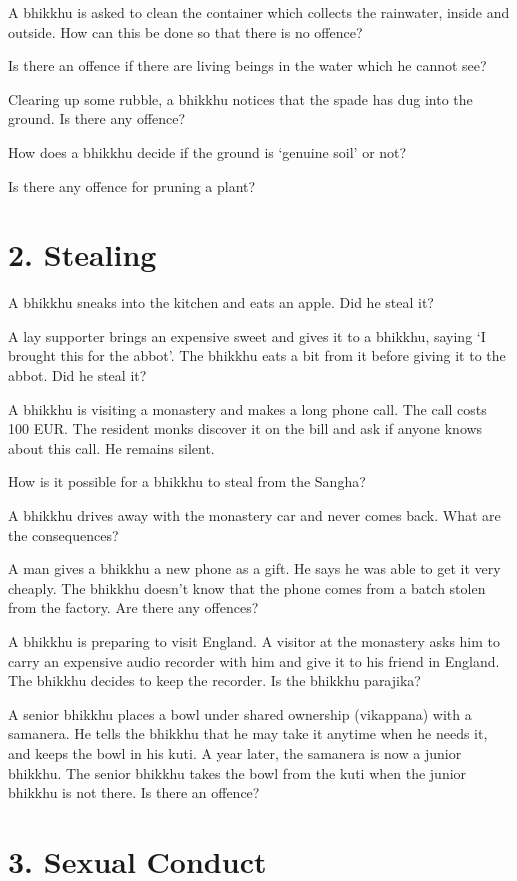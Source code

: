 A bhikkhu is asked to clean the container which collects the rainwater,
inside and outside. How can this be done so that there is no offence?

Is there an offence if there are living beings in the water which he
cannot see?

Clearing up some rubble, a bhikkhu notices that the spade has dug into
the ground. Is there any offence?

How does a bhikkhu decide if the ground is `genuine soil' or not?

Is there any offence for pruning a plant?

\section{2. Stealing}

A bhikkhu sneaks into the kitchen and eats an apple. Did he steal it?

A lay supporter brings an expensive sweet and gives it to a bhikkhu,
saying `I brought this for the abbot'. The bhikkhu eats a bit from it
before giving it to the abbot. Did he steal it?

A bhikkhu is visiting a monastery and makes a long phone call. The call
costs 100 EUR. The resident monks discover it on the bill and ask if
anyone knows about this call. He remains silent.

How is it possible for a bhikkhu to steal from the Sangha?

A bhikkhu drives away with the monastery car and never comes back. What
are the consequences?

A man gives a bhikkhu a new phone as a gift. He says he was able to get
it very cheaply. The bhikkhu doesn't know that the phone comes from a
batch stolen from the factory. Are there any offences?

A bhikkhu is preparing to visit England. A visitor at the monastery asks
him to carry an expensive audio recorder with him and give it to his
friend in England. The bhikkhu decides to keep the recorder. Is the
bhikkhu parajika?

A senior bhikkhu places a bowl under shared ownership (vikappana) with a
samanera. He tells the bhikkhu that he may take it anytime when he needs
it, and keeps the bowl in his kuti. A year later, the samanera is now a
junior bhikkhu. The senior bhikkhu takes the bowl from the kuti when the
junior bhikkhu is not there. Is there an offence?

\section{3. Sexual Conduct}

